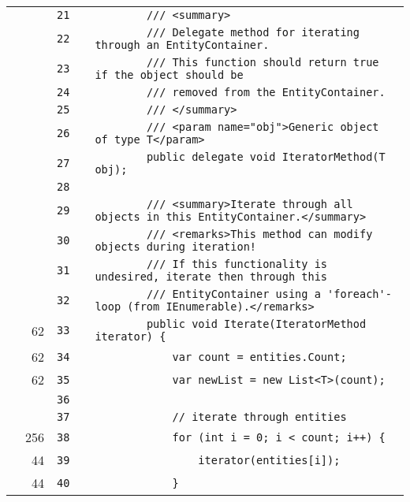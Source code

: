 \documentclass[a4paper,landscape,10pt]{article}
\begin{document}
\begin{longtable}[l]{lrrll}
\cellcolor{gray} &  & \verb~21~ & & \verb~        /// <summary>~\\
\cellcolor{gray} &  & \verb~22~ & & \verb~        /// Delegate method for iterating through an EntityContainer.~\\
\cellcolor{gray} &  & \verb~23~ & & \verb~        /// This function should return true if the object should be~\\
\cellcolor{gray} &  & \verb~24~ & & \verb~        /// removed from the EntityContainer.~\\
\cellcolor{gray} &  & \verb~25~ & & \verb~        /// </summary>~\\
\cellcolor{gray} &  & \verb~26~ & & \verb~        /// <param name="obj">Generic object of type T</param>~\\
\cellcolor{gray} &  & \verb~27~ & & \verb~        public delegate void IteratorMethod(T obj);~\\
\cellcolor{gray} &  & \verb~28~ & & \verb~~\\
\cellcolor{gray} &  & \verb~29~ & & \verb~        /// <summary>Iterate through all objects in this EntityContainer.</summary>~\\
\cellcolor{gray} &  & \verb~30~ & & \verb~        /// <remarks>This method can modify objects during iteration!~\\
\cellcolor{gray} &  & \verb~31~ & & \verb~        /// If this functionality is undesired, iterate then through this~\\
\cellcolor{gray} &  & \verb~32~ & & \verb~        /// EntityContainer using a 'foreach'-loop (from IEnumerable).</remarks>~\\
\cellcolor{green} & 62 & \verb~33~ & & \verb~        public void Iterate(IteratorMethod iterator) {~\\
\cellcolor{green} & 62 & \verb~34~ & & \verb~            var count = entities.Count;~\\
\cellcolor{green} & 62 & \verb~35~ & & \verb~            var newList = new List<T>(count);~\\
\cellcolor{gray} &  & \verb~36~ & & \verb~~\\
\cellcolor{gray} &  & \verb~37~ & & \verb~            // iterate through entities~\\
\cellcolor{green} & 256 & \verb~38~ & & \verb~            for (int i = 0; i < count; i++) {~\\
\cellcolor{green} & 44 & \verb~39~ & & \verb~                iterator(entities[i]);~\\
\cellcolor{green} & 44 & \verb~40~ & & \verb~            }~\\

\end{longtable}
\end{document}
